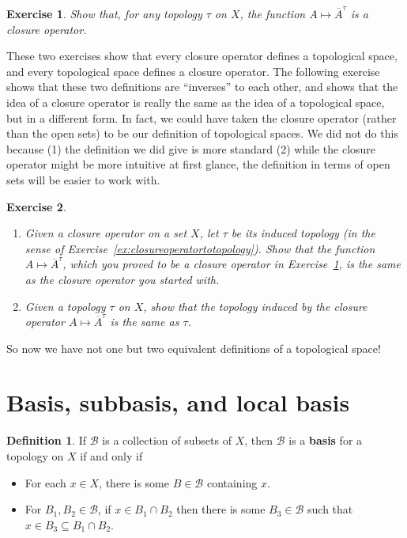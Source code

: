 \documentclass[12pt]{amsart}
\newtheorem{exercise}{Exercise}[section]
\theoremstyle{definition}
\newtheorem{definition}[theorem]{Definition}
\theoremstyle{remark}
\newcommand{\0}{\emptyset}
\newcommand{\closure}[1]{\overline{#1}}
\newcommand{\B}{\mathcal B}
\begin{document}
\begin{exercise}\label{ex:topologytoclosureoperator}
Show that, for any topology $\tau$ on $X$, the function $A \mapsto \closure{A}^\tau$ is a closure operator.
\end{exercise}

These two exercises show that every closure operator defines a topological space, and every topological space defines a closure operator. The following exercise shows that these two definitions are ``inverses'' to each other, and shows that the idea of a closure operator is really the same as the idea of a topological space, but in a different form. In fact, we could have taken the closure operator (rather than the open sets) to be our definition of topological spaces. We did not do this because (1) the definition we did give is more standard (2) while the closure operator might be more intuitive at first glance, the definition in terms of open sets will be easier to work with.

\begin{exercise}\rm\
\begin{enumerate}
\item Given a closure operator on a set $X$, let $\tau$ be its induced topology (in the sense of Exercise~\ref{ex:closureoperatortotopology}). Show that the function $A \mapsto \closure{A}^\tau$, which you proved to be a closure operator in Exercise~\ref{ex:topologytoclosureoperator}, is the same as the closure operator you started with.
\item Given a topology $\tau$ on $X$, show that the topology induced by the closure operator $A \mapsto \closure{A}^\tau$ is the same as $\tau$.
\end{enumerate}
\end{exercise}

So now we have not one but two equivalent definitions of a topological space!

\section{Basis, subbasis, and local basis}

\begin{definition}
If $\B$ is a collection of subsets of $X$, then $\B$ is a \textbf{basis} for a topology on $X$ if and only if
\begin{itemize}
\item For each $x \in X$, there is some $B \in \B$ containing $x$.
\item For $B_1,B_2 \in \B$, if $x \in B_1 \cap B_2$ then there is some $B_3 \in \B$ such that $x \in B_3 \subseteq B_1 \cap B_2$.
\end{itemize}
\end{definition}
\end{document}
